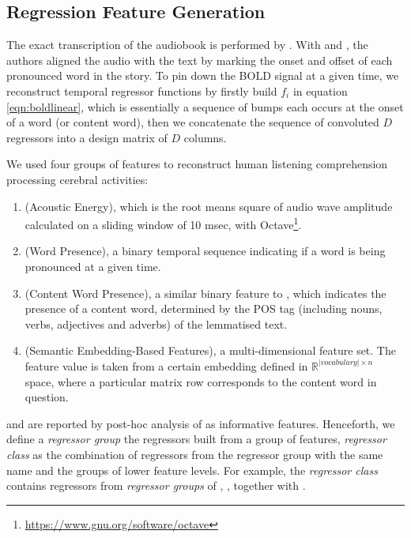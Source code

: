 \subsection{Regression Feature Generation}
\label{subsec:regressionfeaturegeneration}
The exact transcription of the audiobook is performed by \textcite{todorovicAnalysesIRMfLors2018}. With  and , the authors aligned the audio with the text by marking the onset and offset of each pronounced word in the story. To pin down the BOLD signal at a given time, we reconstruct temporal regressor functions by firstly build \(f_{i}\) in equation \ref{eqn:boldlinear}, which is essentially a sequence of bumps each occurs at the onset of a word (or content word), then we concatenate the sequence of convoluted \(D\) regressors into a design matrix of \(D\) columns.

We used four groups of features to reconstruct human listening comprehension processing cerebral activities:
\begin{enumerate}
	\item {} (Acoustic Energy), which is the root means square of audio wave amplitude calculated on a sliding window of 10 msec, with Octave\footnote{\url{https://www.gnu.org/software/octave}}.
	\item {} (Word Presence), a binary temporal sequence indicating if a word is being pronounced at a given time.
	\item {} (Content Word Presence), a similar binary feature to , which indicates the presence of a content word, determined by the POS tag (including nouns, verbs, adjectives and adverbs) of the lemmatised text. 
	\item {} (Semantic Embedding-Based Features), a multi-dimensional feature set. The feature value is taken from a certain embedding defined in \(\mathbb{R}^{\vert vocabulary \vert \times n}\) space, where a particular matrix row corresponds to the content word in question. 
\end{enumerate}

 and  are reported by post-hoc analysis of \textcite{todorovicAnalysesIRMfLors2018} as informative features. Henceforth, we define a \emph{regressor group} the regressors built from a group of features, \emph{regressor class} as the combination of regressors from the regressor group with the same name and the groups of lower feature levels. For example, the \emph{regressor class}  contains regressors from \emph{regressor groups} of , , together with .

